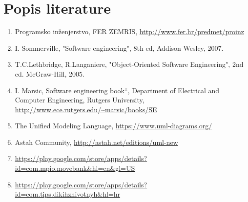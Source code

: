 \chapter*{Popis literature}
		
		\begin{enumerate}
			
			
			\item  Programsko inženjerstvo, FER ZEMRIS, \url{http://www.fer.hr/predmet/proinz}
			
			\item  I. Sommerville, "Software engineering", 8th ed, Addison Wesley, 2007.
			
			\item  T.C.Lethbridge, R.Langaniere, "Object-Oriented Software Engineering", 2nd ed. McGraw-Hill, 2005.
			
			\item  I. Marsic, Software engineering book``, Department of Electrical and Computer Engineering, Rutgers University, \url{http://www.ece.rutgers.edu/~marsic/books/SE}
			
			\item  The Unified Modeling Language, \url{https://www.uml-diagrams.org/}
			
			\item  Astah Community, \url{http://astah.net/editions/uml-new}
			
			\item  \url{https://play.google.com/store/apps/details?id=com.mpio.movebank&hl=en&gl=US}
			
			\item  \url{https://play.google.com/store/apps/details?id=com.tips.dikihzhivotnyh&hl=hr}
		\end{enumerate}
		
		 